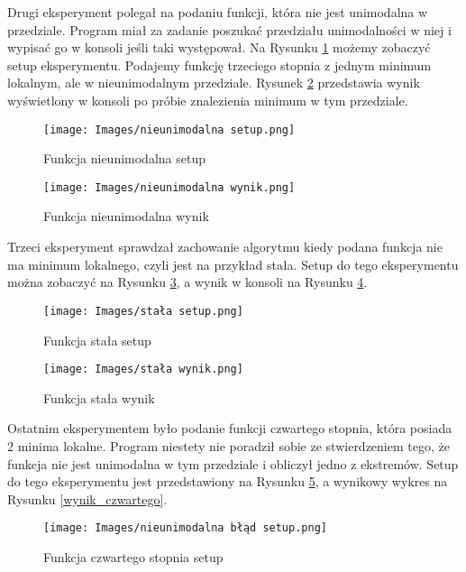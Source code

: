 \documentclass{classrep}
\begin{document}
Drugi eksperyment polegał na podaniu funkcji, która nie jest unimodalna w przedziale. Program miał za zadanie poszukać przedziału unimodalności w niej i wypisać go w konsoli jeśli taki występował. Na Rysunku \ref{setup_nieunimodalna} możemy zobaczyć setup eksperymentu. Podajemy funkcję trzeciego stopnia z jednym minimum lokalnym, ale w nieunimodalnym przedziale. Rysunek \ref{wynik_nieunimodalna} przedstawia wynik wyświetlony w konsoli po próbie znalezienia minimum w tym przedziale.

\begin{figure}[H]
    \centering
    \texttt{[image: Images/nieunimodalna setup.png]}
    \caption[Funkcja nieunimodalna setup]{Funkcja nieunimodalna setup}
    \label{setup_nieunimodalna}
\end{figure}

\begin{figure}[H]
    \centering
    \texttt{[image: Images/nieunimodalna wynik.png]}
    \caption[Funkcja nieunimodalna wynik]{Funkcja nieunimodalna wynik}
    \label{wynik_nieunimodalna}
\end{figure}

Trzeci eksperyment sprawdzał zachowanie algorytmu kiedy podana funkcja nie ma minimum lokalnego, czyli jest na przykład stała. Setup do tego eksperymentu można zobaczyć na Rysunku \ref{setup_stala}, a wynik w konsoli na Rysunku \ref{wynik_stala}.

\begin{figure}[H]
    \centering
    \texttt{[image: Images/stała setup.png]}
    \caption[Funkcja stała setup]{Funkcja stała setup}
    \label{setup_stala}
\end{figure}

\begin{figure}[H]
    \centering
    \texttt{[image: Images/stała wynik.png]}
    \caption[Funkcja stała wynik]{Funkcja stała wynik}
    \label{wynik_stala}
\end{figure}

Ostatnim eksperymentem było podanie funkcji czwartego stopnia, która posiada 2 minima lokalne. Program niestety nie poradził sobie ze stwierdzeniem tego, że funkcja nie jest unimodalna w tym przedziale i obliczył jedno z ekstremów. Setup do tego eksperymentu jest przedstawiony na Rysunku \ref{setup_czwartego}, a wynikowy wykres na Rysunku \ref{wynik_czwartego}.

\begin{figure}[H]
    \centering
    \texttt{[image: Images/nieunimodalna błąd setup.png]}
    \caption[Funkcja czwartego stopnia setup]{Funkcja czwartego stopnia setup}
    \label{setup_czwartego}
\end{figure}
\end{document}
